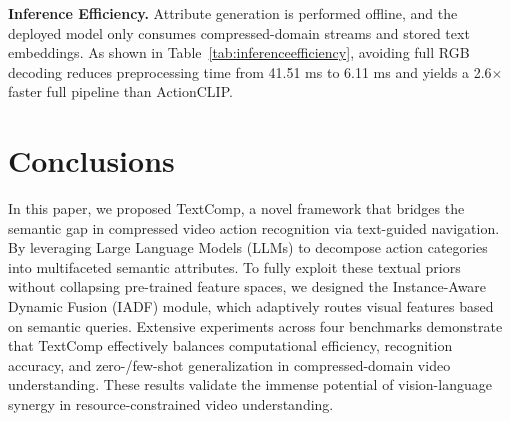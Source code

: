 \documentclass[letterpaper]{article} %
\begin{document}
\noindent\textbf{Inference Efficiency.} Attribute generation is performed offline, and the deployed model only consumes compressed-domain streams and stored text embeddings. As shown in Table~\ref{tab:inferenceefficiency}, avoiding full RGB decoding reduces preprocessing time from 41.51 ms to 6.11 ms and yields a 2.6$\times$ faster full pipeline than ActionCLIP.

\section{Conclusions}
\label{sec:conclusion}
In this paper, we proposed TextComp, a novel framework that bridges the semantic gap in compressed video action recognition via text-guided navigation. By leveraging Large Language Models (LLMs) to decompose action categories into multifaceted semantic attributes. To fully exploit these textual priors without collapsing pre-trained feature spaces, we designed the Instance-Aware Dynamic Fusion (IADF) module, which adaptively routes visual features based on semantic queries. Extensive experiments across four benchmarks demonstrate that TextComp effectively balances computational efficiency, recognition accuracy, and zero-/few-shot generalization in compressed-domain video understanding. These results validate the immense potential of vision-language synergy in resource-constrained video understanding.


% 
\end{document}
